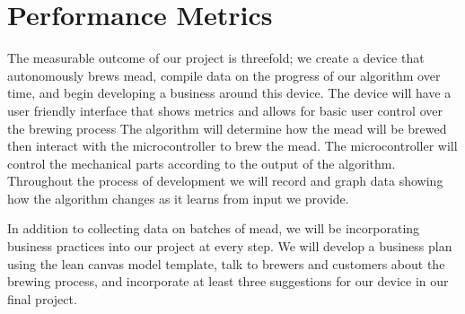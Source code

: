 \documentclass[letterpaper,10pt]{article}
\begin{document}
\section{Performance Metrics}
The measurable outcome of our project is threefold; we create a device that 
autonomously brews mead, compile data on the progress of our algorithm 
over time, and begin developing a business around this device. 
The device will have a user friendly interface that shows metrics and allows
for basic user control over the brewing process The algorithm will determine
how the mead will be brewed then interact with the microcontroller to brew 
the mead. The microcontroller will control the mechanical parts according to
the output of the algorithm. Throughout the process of development we 
will record and graph data showing how the algorithm changes as it learns 
from input we provide. 

In addition to collecting data on batches of mead, we will be 
incorporating business practices into our project at every step. We will 
develop a business plan using the lean canvas model template, talk to 
brewers and customers about the brewing process, and incorporate at least 
three suggestions for our device in our final project.
\end{document}

